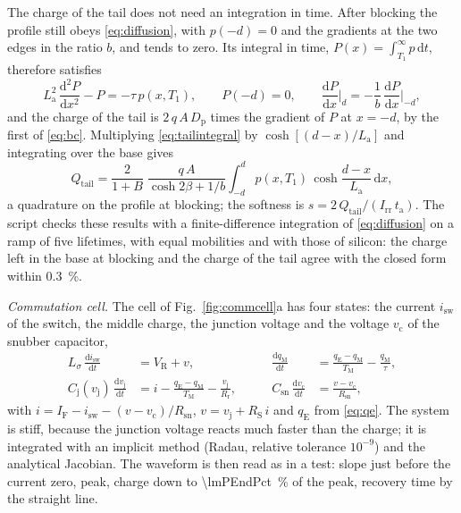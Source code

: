 \documentclass[10pt,a4paper]{scrartcl}
\newcommand{\IF}{I_\mathrm{F}}
\newcommand{\VR}{V_\mathrm{R}}
\newcommand{\Irr}{I_\mathrm{rr}}
\newcommand{\ta}{t_\mathrm{a}}
\newcommand{\TM}{T_\mathrm{M}}
\newcommand{\Tone}{T_1}
\newcommand{\qE}{q_\mathrm{E}}
\newcommand{\qM}{q_\mathrm{M}}
\newcommand{\vj}{v_\mathrm{j}}
\newcommand{\RS}{R_\mathrm{S}}
\newcommand{\Rr}{R_\mathrm{r}}
\newcommand{\Cj}{C_\mathrm{j}}
\newcommand{\Csn}{C_\mathrm{sn}}
\newcommand{\Rsn}{R_\mathrm{sn}}
\newcommand{\diff}{\mathrm{d}}
\newcommand{\Ls}{L_\sigma}                    %
\newcommand{\La}{L_\mathrm{a}}
\newcommand{\Dp}{D_\mathrm{p}}
\begin{document}
The charge of the tail does not need an integration in time. After blocking the profile still obeys \eqref{eq:diffusion}, with $p(-d) = 0$ and the gradients at the two edges in the ratio $b$, and tends to zero. Its integral in time, $P(x) = \int_{\Tone}^{\infty} p\,\diff t$, therefore satisfies
\begin{equation}
\La^2\,\frac{\diff^2 P}{\diff x^2} - P = -\tau\,p(x,\Tone) , \qquad P(-d) = 0 , \qquad \frac{\diff P}{\diff x}\bigg|_{d} = -\frac1b\,\frac{\diff P}{\diff x}\bigg|_{-d} ,
\label{eq:tailintegral}
\end{equation}
and the charge of the tail is $2\,q\,A\,\Dp$ times the gradient of $P$ at $x = -d$, by the first of \eqref{eq:bc}. Multiplying \eqref{eq:tailintegral} by $\cosh[(d-x)/\La]$ and integrating over the base gives
\begin{equation}
Q_\mathrm{tail} = \frac{2}{1+B}\;\frac{q\,A}{\cosh 2\beta + 1/b}\int_{-d}^{d} p(x,\Tone)\,\cosh\frac{d-x}{\La}\,\diff x ,
\label{eq:qtail}
\end{equation}
a quadrature on the profile at blocking; the softness is $s = 2\,Q_\mathrm{tail}/(\Irr\,\ta)$. The script checks these results with a finite-difference integration of \eqref{eq:diffusion} on a ramp of five lifetimes, with equal mobilities and with those of silicon: the charge left in the base at blocking and the charge of the tail agree with the closed form within \SI{0.3}{\percent}.

\emph{Commutation cell.} The cell of Fig.~\ref{fig:commcell}a has four states: the current $i_\mathrm{sw}$ of the switch, the middle charge, the junction voltage and the voltage $v_\mathrm{c}$ of the snubber capacitor,
\begin{equation}
\begin{aligned}
\Ls\,\frac{\diff i_\mathrm{sw}}{\diff t} &= \VR + v , &\qquad \frac{\diff\qM}{\diff t} &= \frac{\qE-\qM}{\TM} - \frac{\qM}{\tau} , \\
\Cj(\vj)\,\frac{\diff\vj}{\diff t} &= i - \frac{\qE-\qM}{\TM} - \frac{\vj}{\Rr} , &\qquad \Csn\,\frac{\diff v_\mathrm{c}}{\diff t} &= \frac{v - v_\mathrm{c}}{\Rsn} ,
\end{aligned}
\end{equation}
with $i = \IF - i_\mathrm{sw} - (v-v_\mathrm{c})/\Rsn$, $v = \vj + \RS\,i$ and $\qE$ from \eqref{eq:qe}. The system is stiff, because the junction voltage reacts much faster than the charge; it is integrated with an implicit method (Radau, relative tolerance $10^{-9}$) and the analytical Jacobian. The waveform is then read as in a test: slope just before the current zero, peak, charge down to \SI{\lmPEndPct}{\percent} of the peak, recovery time by the straight line.
\end{document}
